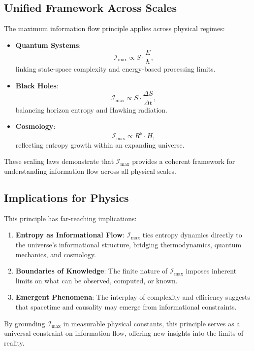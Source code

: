 \documentclass[12pt]{article}
\begin{document}
\subsection{Unified Framework Across Scales}
The maximum information flow principle applies across physical regimes:
\begin{itemize}
    \item \textbf{Quantum Systems}:
    \[
    \mathcal{I}_{\text{max}} \propto S \cdot \frac{E}{\hbar},
    \]
    linking state-space complexity and energy-based processing limits.
    \item \textbf{Black Holes}:
    \[
    \mathcal{I}_{\text{max}} \propto S \cdot \frac{\Delta S}{\Delta t},
    \]
    balancing horizon entropy and Hawking radiation.
    \item \textbf{Cosmology}:
    \[
    \mathcal{I}_{\text{max}} \propto R^5 \cdot H,
    \]
    reflecting entropy growth within an expanding universe.
\end{itemize}

These scaling laws demonstrate that \( \mathcal{I}_{\text{max}} \) provides a coherent framework for understanding information flow across all physical scales.

\subsection{Implications for Physics}
This principle has far-reaching implications:
\begin{enumerate}
    \item \textbf{Entropy as Informational Flow}: \( \mathcal{I}_{\text{max}} \) ties entropy dynamics directly to the universe’s informational structure, bridging thermodynamics, quantum mechanics, and cosmology.
    \item \textbf{Boundaries of Knowledge}: The finite nature of \( \mathcal{I}_{\text{max}} \) imposes inherent limits on what can be observed, computed, or known.
    \item \textbf{Emergent Phenomena}: The interplay of complexity and efficiency suggests that spacetime and causality may emerge from informational constraints.
\end{enumerate}

By grounding \( \mathcal{I}_{\text{max}} \) in measurable physical constants, this principle serves as a universal constraint on information flow, offering new insights into the limits of reality.
\end{document}
